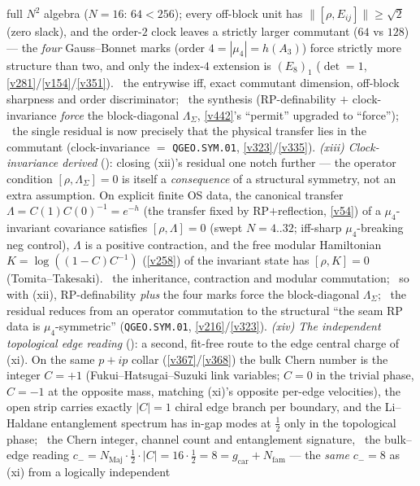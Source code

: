 \documentclass[11pt,a4paper]{article}
\newcommand{\Nfam}{N_{\mathrm{fam}}}
\newcommand{\gcar}{g_{\mathrm{car}}}
\begin{document}
\begin{keybox}
full $N^2$ algebra ($N{=}16$: $64{<}256$); every off-block unit has $\|[\rho,E_{ij}]\|{\ge}\sqrt2$ (zero slack),
and the order-$2$ clock leaves a strictly larger commutant ($64$ vs $128$) --- the \emph{four} Gauss--Bonnet marks
(order $4{=}|\mu_4|{=}h(A_3)$) force strictly more structure than two, and only the index-$4$ extension is $(E_8)_1$
($\det{=}1$, \vref{v281}/\vref{v154}/\vref{v351}). \mE\ the entrywise iff, exact commutant dimension, off-block
sharpness and order discriminator; \mC\ the synthesis (RP-definability $+$ clock-invariance \emph{force} the
block-diagonal $\Lambda_\Sigma$, \vref{v442}'s ``permit'' upgraded to ``force''); \mO\ the single residual is now
precisely that the physical transfer lies in the commutant (clock-invariance $=$ \texttt{QGEO.SYM.01},
\vref{v323}/\vref{v335}). \emph{(xiii) Clock-invariance derived} (): closing
(xii)'s residual one notch further --- the operator condition $[\rho,\Lambda_\Sigma]{=}0$ is itself a
\emph{consequence} of a structural symmetry, not an extra assumption. On explicit finite OS data, the canonical
transfer $\Lambda{=}C(1)C(0)^{-1}{=}e^{-h}$ (the transfer fixed by RP$+$reflection, \vref{v54}) of a
$\mu_4$-invariant covariance satisfies $[\rho,\Lambda]{=}0$ (swept $N{=}4..32$; iff-sharp $\mu_4$-breaking neg
control), $\Lambda$ is a positive contraction, and the free modular Hamiltonian $K{=}\log((1{-}C)C^{-1})$
(\vref{v258}) of the invariant state has $[\rho,K]{=}0$ (Tomita--Takesaki). \mE\ the inheritance, contraction and
modular commutation; \mC\ so with (xii), RP-definability \emph{plus} the four marks force the block-diagonal
$\Lambda_\Sigma$; \mO\ the residual reduces from an operator commutation to the structural ``the seam RP data is
$\mu_4$-symmetric'' (\texttt{QGEO.SYM.01}, \vref{v216}/\vref{v323}). \emph{(xiv) The independent topological edge
reading} (): a second, fit-free route to the edge central charge of (xi). On the
same $p{+}ip$ collar (\vref{v367}/\vref{v368}) the bulk Chern number is the integer $C{=}{+}1$
(Fukui--Hatsugai--Suzuki link variables; $C{=}0$ in the trivial phase, $C{=}{-}1$ at the opposite mass, matching
(xi)'s opposite per-edge velocities), the open strip carries exactly $|C|{=}1$ chiral edge branch per boundary, and
the Li--Haldane entanglement spectrum has in-gap modes at $\tfrac12$ only in the topological phase; \mE\ the Chern
integer, channel count and entanglement signature, \mC\ the bulk--edge reading $c_-{=}N_{\mathrm{Maj}}\cdot\tfrac12
\cdot|C|{=}16\cdot\tfrac12{=}8{=}\gcar{+}\Nfam$ --- the \emph{same} $c_-{=}8$ as (xi) from a logically independent

\end{keybox}
\end{document}
